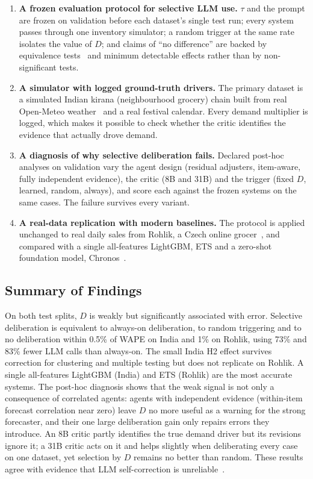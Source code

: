 \documentclass[conference]{IEEEtran}
\begin{document}
\begin{enumerate}
\item \textbf{A frozen evaluation protocol for selective LLM use.} $\tau$ and the prompt are frozen
on validation before each dataset's single test run; every system passes through one inventory
simulator; a random trigger at the same rate isolates the value of $D$; and claims of ``no
difference'' are backed by equivalence tests~\cite{schuirmann1987} and minimum detectable effects
rather than by non-significant tests.
\item \textbf{A simulator with logged ground-truth drivers.} The primary dataset is a simulated
Indian kirana (neighbourhood grocery) chain built from real Open-Meteo weather~\cite{openmeteo} and
a real festival calendar. Every demand multiplier is logged, which makes it possible to check
whether the critic identifies the evidence that actually drove demand.
\item \textbf{A diagnosis of why selective deliberation fails.} Declared post-hoc analyses on
validation vary the agent design (residual adjusters, item-aware, fully independent evidence), the
critic (8B and 31B) and the trigger (fixed $D$, learned, random, always), and score each against the
frozen systems on the same cases. The failure survives every variant.
\item \textbf{A real-data replication with modern baselines.} The protocol is applied unchanged to
real daily sales from Rohlik, a Czech online grocer~\cite{rohlik}, and compared with a single
all-features LightGBM, ETS and a zero-shot foundation model, Chronos~\cite{ansari2024}.
\end{enumerate}

\subsection{Summary of Findings}

On both test splits, $D$ is weakly but significantly associated with error. Selective deliberation
is equivalent to always-on deliberation, to random triggering and to no deliberation within 0.5\%
of WAPE on India and 1\% on Rohlik, using 73\% and 83\% fewer LLM calls than always-on. The small
India H2 effect survives correction for clustering and multiple testing but does not replicate on
Rohlik. A single all-features LightGBM (India) and ETS (Rohlik) are the most accurate systems. The
post-hoc diagnosis shows that the weak signal is not only a consequence of correlated agents:
agents with independent evidence (within-item forecast correlation near zero) leave $D$ no more
useful as a warning for the strong forecaster, and their one large deliberation gain only repairs
errors they introduce. An 8B critic partly identifies the true demand driver but its revisions
ignore it; a 31B critic acts on it and helps slightly when deliberating every case on one dataset,
yet selection by $D$ remains no better than random. These results agree with evidence that LLM
self-correction is unreliable~\cite{huang2024}.
\end{document}
